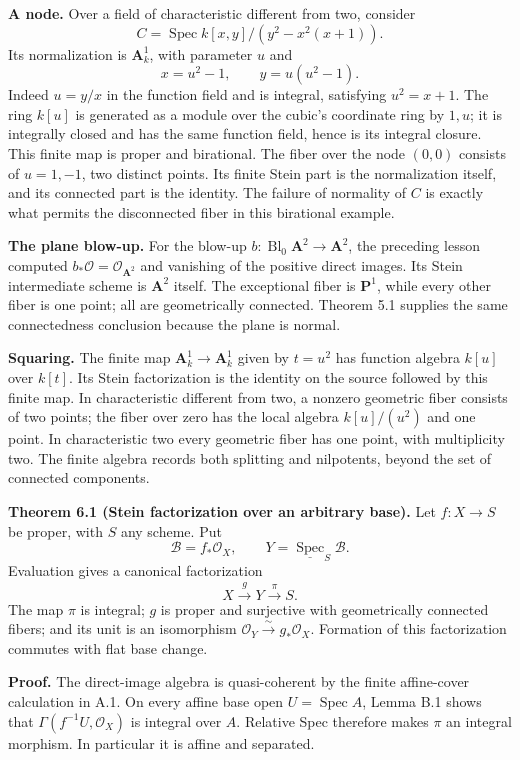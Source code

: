 \documentclass[11pt]{article}
\begin{document}
\textbf{A node.} Over a field of characteristic different from two,
consider \[
C=\operatorname{Spec}k[x,y]/(y^2-x^2(x+1)).
\] Its normalization is \(\mathbf A^1_k\), with parameter \(u\) and \[
x=u^2-1,\qquad y=u(u^2-1).
\] Indeed \(u=y/x\) in the function field and is integral, satisfying
\(u^2=x+1\). The ring \(k[u]\) is generated as a module over the cubic's
coordinate ring by \(1,u\); it is integrally closed and has the same
function field, hence is its integral closure. This finite map is proper
and birational. The fiber over the node \((0,0)\) consists of
\(u=1,-1\), two distinct points. Its finite Stein part is the
normalization itself, and its connected part is the identity. The
failure of normality of \(C\) is exactly what permits the disconnected
fiber in this birational example.

\textbf{The plane blow-up.} For the blow-up
\(b:\operatorname{Bl}_0\mathbf A^2\to\mathbf A^2\), the preceding lesson
computed \(b_*\mathcal O=\mathcal O_{\mathbf A^2}\) and vanishing of the
positive direct images. Its Stein intermediate scheme is \(\mathbf A^2\)
itself. The exceptional fiber is \(\mathbf P^1\), while every other
fiber is one point; all are geometrically connected. Theorem 5.1
supplies the same connectedness conclusion because the plane is normal.

\textbf{Squaring.} The finite map \(\mathbf A^1_k\to\mathbf A^1_k\)
given by \(t=u^2\) has function algebra \(k[u]\) over \(k[t]\). Its
Stein factorization is the identity on the source followed by this
finite map. In characteristic different from two, a nonzero geometric
fiber consists of two points; the fiber over zero has the local algebra
\(k[u]/(u^2)\) and one point. In characteristic two every geometric
fiber has one point, with multiplicity two. The finite algebra records
both splitting and nilpotents, beyond the set of connected components.

\textbf{Theorem 6.1 (Stein factorization over an arbitrary base).} Let
\(f:X\to S\) be proper, with \(S\) any scheme. Put \[
\mathcal B=f_*\mathcal O_X,
\qquad Y=\underline{\operatorname{Spec}}_S\mathcal B.
\] Evaluation gives a canonical factorization \[
X\xrightarrow{g}Y\xrightarrow{\pi}S.
\] The map \(\pi\) is integral; \(g\) is proper and surjective with
geometrically connected fibers; and its unit is an isomorphism
\(\mathcal O_Y\xrightarrow{\sim}g_*\mathcal O_X\). Formation of this
factorization commutes with flat base change.

\textbf{Proof.} The direct-image algebra is quasi-coherent by the finite
affine-cover calculation in A.1. On every affine base open
\(U=\operatorname{Spec}A\), Lemma B.1 shows that
\(\Gamma(f^{-1}U,\mathcal O_X)\) is integral over \(A\). Relative Spec
therefore makes \(\pi\) an integral morphism. In particular it is affine
and separated.
\end{document}
